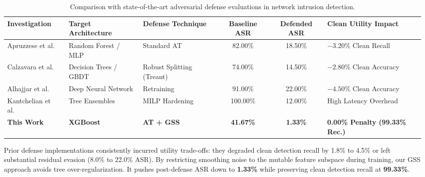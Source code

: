 \documentclass[final,5p,times,twocolumn]{elsarticle}
\begin{document}
\begin{table}[htbp]
\centering
\small
\renewcommand{\arraystretch}{1.1}
{\linespread{1.0}\selectfont
\caption{Comparison with state-of-the-art adversarial defense evaluations in network intrusion detection.}
\label{tab:sota_comparison}
\begin{tabularx}{\textwidth}{l p{2.4cm} p{2.2cm} c c X}
\toprule
\textbf{Investigation} & \textbf{Target Architecture} & \textbf{Defense Technique} & \textbf{Baseline ASR} & \textbf{Defended ASR} & \textbf{Clean Utility Impact} \\
\midrule
Apruzzese et al.~\cite{apruzzese2022modeling} & Random Forest / MLP & Standard AT & 82.00\% & 18.50\% & $-3.20\%$ Clean Recall \\
Calzavara et al.~\cite{calzavara2020treant} & Decision Trees / GBDT & Robust Splitting (Treant) & 74.00\% & 14.50\% & $-2.80\%$ Clean Accuracy \\
Alhajjar et al.~\cite{alhajjar2021adversarial} & Deep Neural Network & Retraining & 91.00\% & 22.00\% & $-4.50\%$ Clean Accuracy \\
Kantchelian et al.~\cite{kantchelian2016evasion} & Tree Ensembles & MILP Hardening & 100.00\% & 12.00\% & High Latency Overhead \\
\midrule
\textbf{This Work} & \textbf{XGBoost} & \textbf{AT + GSS} & \textbf{41.67\%} & \textbf{1.33\%} & \textbf{0.00\% Penalty (99.33\% Rec.)} \\
\bottomrule
\end{tabularx}
\par}
\end{table}

Prior defense implementations consistently incurred utility trade-offs: they degraded clean detection recall by 1.8\% to 4.5\% or left substantial residual evasion (8.0\% to 22.0\% ASR). By restricting smoothing noise to the mutable feature subspace during training, our GSS approach avoids tree over-regularization. It pushes post-defense ASR down to \textbf{1.33\%} while preserving clean detection recall at \textbf{99.33\%}.
\end{document}
